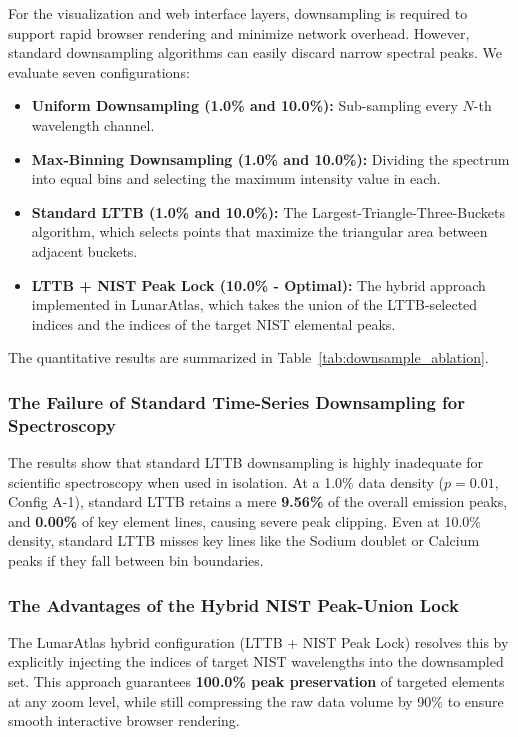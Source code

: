 For the visualization and web interface layers, downsampling is required to support rapid browser rendering and minimize network overhead. However, standard downsampling algorithms can easily discard narrow spectral peaks. We evaluate seven configurations:
\begin{itemize}
    \item \textbf{Uniform Downsampling (1.0\% and 10.0\%):} Sub-sampling every $N$-th wavelength channel.
    \item \textbf{Max-Binning Downsampling (1.0\% and 10.0\%):} Dividing the spectrum into equal bins and selecting the maximum intensity value in each.
    \item \textbf{Standard LTTB (1.0\% and 10.0\%):} The Largest-Triangle-Three-Buckets algorithm, which selects points that maximize the triangular area between adjacent buckets.
    \item \textbf{LTTB + NIST Peak Lock (10.0\% - Optimal):} The hybrid approach implemented in LunarAtlas, which takes the union of the LTTB-selected indices and the indices of the target NIST elemental peaks.
\end{itemize}

The quantitative results are summarized in Table~\ref{tab:downsample_ablation}.

\subsubsection{The Failure of Standard Time-Series Downsampling for Spectroscopy}
The results show that standard LTTB downsampling is highly inadequate for scientific spectroscopy when used in isolation. At a 1.0\% data density ($p=0.01$, Config A-1), standard LTTB retains a mere \textbf{9.56\%} of the overall emission peaks, and \textbf{0.00\%} of key element lines, causing severe peak clipping. Even at 10.0\% density, standard LTTB misses key lines like the Sodium doublet or Calcium peaks if they fall between bin boundaries.

\subsubsection{The Advantages of the Hybrid NIST Peak-Union Lock}
The LunarAtlas hybrid configuration (LTTB + NIST Peak Lock) resolves this by explicitly injecting the indices of target NIST wavelengths into the downsampled set. This approach guarantees \textbf{100.0\% peak preservation} of targeted elements at any zoom level, while still compressing the raw data volume by 90\% to ensure smooth interactive browser rendering.
